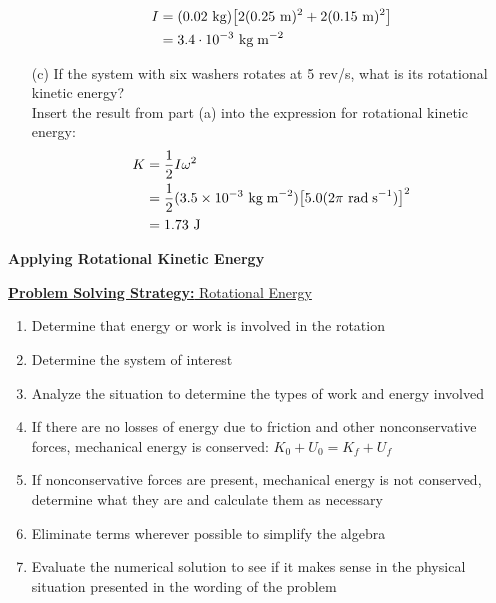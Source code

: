 \documentclass[a4paper]{article}
\let\bf\textbf
\newcommand\rads{\text{ rad\;s}^{-1}}
\newcommand\m{\text{ m}}
\newcommand\J{\text{ J}}
\newcommand\kg{\text{ kg}}
\newcommand\kgmm{\text{ kg\;m}^{-2}}
\begin{document}
\begin{shaded}
\begin{enumerate}
        \begin{align*}
            I &= (0.02\kg)\big[2(0.25\m)^2 + 2(0.15\m)^2\big]\\
            &= 3.4 \cdot 10^{-3}\kgmm
        \end{align*}
        \item[(c)] If the system with six washers rotates at 5 rev/s, what is its rotational kinetic energy?
        \vspace{1mm}\\
        Insert the result from part (a) into the expression for rotational kinetic energy:
        \begin{align*}
            K &= \frac{1}{2}I\omega^2\\
            &= \frac{1}{2}(3.5 \times 10^{-3}\kgmm)\big[5.0(2\pi\rads)\big]^2\\
            &= 1.73\J
        \end{align*}
    \end{enumerate}
\end{shaded}
\newpage
\noindent\bf{Applying Rotational Kinetic Energy}
\begin{shaded}
    \underline{\bf{Problem Solving Strategy:} Rotational Energy}
    \begin{enumerate}
        \item Determine that energy or work is involved in the rotation
        \item Determine the system of interest
        \item Analyze the situation to determine the types of work and energy involved
        \item If there are no losses of energy due to friction and other nonconservative forces, mechanical energy is conserved: $K_0 + U_0 = K_f + U_f$
        \item If nonconservative forces are present, mechanical energy is not conserved, determine what they are and calculate them as necessary
        \item Eliminate terms wherever possible to simplify the algebra
        \item Evaluate the numerical solution to see if it makes sense in the physical situation presented in the wording of the problem
    \end{enumerate}
\end{shaded}
\end{document}
